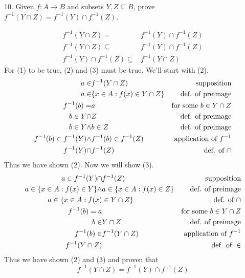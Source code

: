 \documentclass{idrisMemo}
\begin{document}
\begin{prooflist}{10. Given $f: A \rightarrow B$ and subsets $Y, Z \subseteq B$,
    prove $f^{-1}(Y \cap Z)=f^{-1}(Y) \cap f^{-1}(Z)$.}
\item \imagedef{}
\setcounter{equation}{0}
\begin{align}
    f^{-1}(Y \cap Z)=&f^{-1}(Y) \cap f^{-1}(Z)\\
    f^{-1}(Y \cap Z)\subseteq &f^{-1}(Y) \cap f^{-1}(Z)\\
    f^{-1}(Y) \cap f^{-1}(Z) \subseteq & f^{-1}(Y \cap Z)
\end{align}
For (1) to be true, (2) and (3) must be true. We'll start with (2).
\begin{align}
    a\in& f^{-1}(Y\cap Z) &\text{supposition}\\
    a\in& \{x \in A: f(x) \in Y\cap Z\} &\text{def. of preimage}\\
    f^{-1}(b) =& a & \text{for some }b\in Y\cap Z\\
    b \in Y \cap& Z &\text{def. of preimage}\\
    b \in Y \land & b \in Z &\text{def. of preimage}\\
    f^{-1}(b) \in f^{-1}(Y) \land& f^{-1}(b) \in f^{-1}(Z)&\text{application of }f^{-1}\\
    f^{-1}(Y) \cap & f^{-1}(Z)&\text{def. of }\cap
\end{align}
Thus we have shown (2). Now we will show (3).
\begin{align}
    a\in f^{-1}(Y) \cap& f^{-1}(Z) &\text{supposition}\\
    a\in \{x \in A: f(x) \in Y\} \land& a\in \{x \in A: f(x) \in Z\} &\text{def. of preimage}\\
    a\in \{x \in A: f(x) &\in Y\cap Z\} &\text{def. of }\cap\\
    f^{-1}(b) = a& &\text{for some }b\in Y\cap Z\\
    b \in& Y \cap Z &\text{def. of preimage}\\
    f^{-1}(b) \in& f^{-1}(Y\cap Z)&\text{application of }f^{-1}\\
    f^{-1}(Y\cap Z)&&\text{def. of }\in
\end{align}
Thus we have shown (2) and (3) and proven that
\[
    f^{-1}(Y \cap Z)=f^{-1}(Y) \cap f^{-1}(Z)
\]
\end{prooflist}
\end{document}
